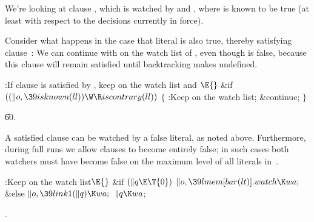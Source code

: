 We're looking at clause , which is watched by %
 and ,
where  is known to be true (at least with respect to the
decisions currently in force).

Consider what happens in the case that literal  is also true,
thereby satisfying clause~: We can continue with  on the
watch list of , even though  is false,
because this
clause will remain satisfied until backtracking makes  undefined.

\Y\B\4:If clause  is satisfied by , keep 
on the watch list and \X${}\E{}$\6
\&{if} ${}((\|o,\39\\{isknown}(\\{ll}))\W\R\\{iscontrary}(\\{ll})){}$\5
${}\{{}$\1\6
:Keep  on the watch list\X;\6
\&{continue};\6
\4${}\}{}$\2\par
\U60.\fi

A satisfied clause  can be watched by a false
literal, as noted above.
Furthermore, during full runs we allow clauses to become entirely false;
in such cases both watchers must have become false
on the maximum level of all literals in~.

\Y\B\4:Keep  on the watch list\X${}\E{}$\6
\&{if} ${}(\|q\E\T{0}){}$\1\5
${}\|o,\39\\{lmem}[\\{bar}(\\{lt})].\\{watch}\K\\{wa};{}$\2\6
\&{else}\1\5
${}\|o,\39\\{link1}(\|q)\K\\{wa};{}$\2\6
${}\|q\K\\{wa}{}$;\par
{}.\fi

